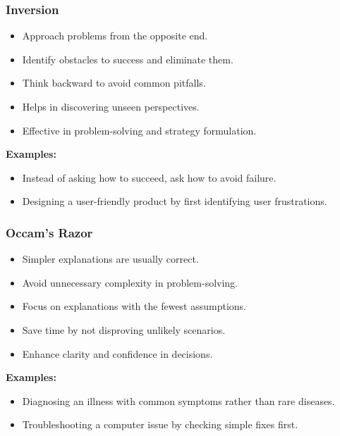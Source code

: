 \begin{frame}[fragile]\frametitle{Inversion}
\begin{itemize}
    \item Approach problems from the opposite end.
    \item Identify obstacles to success and eliminate them.
    \item Think backward to avoid common pitfalls.
    \item Helps in discovering unseen perspectives.
    \item Effective in problem-solving and strategy formulation.
\end{itemize}
\textbf{Examples:}
\begin{itemize}
    \item Instead of asking how to succeed, ask how to avoid failure.
    \item Designing a user-friendly product by first identifying user frustrations.
\end{itemize}
\end{frame}

\begin{frame}[fragile]\frametitle{Occam’s Razor}
\begin{itemize}
    \item Simpler explanations are usually correct.
    \item Avoid unnecessary complexity in problem-solving.
    \item Focus on explanations with the fewest assumptions.
    \item Save time by not disproving unlikely scenarios.
    \item Enhance clarity and confidence in decisions.
\end{itemize}
\textbf{Examples:}
\begin{itemize}
    \item Diagnosing an illness with common symptoms rather than rare diseases.
    \item Troubleshooting a computer issue by checking simple fixes first.
\end{itemize}

\end{frame}

